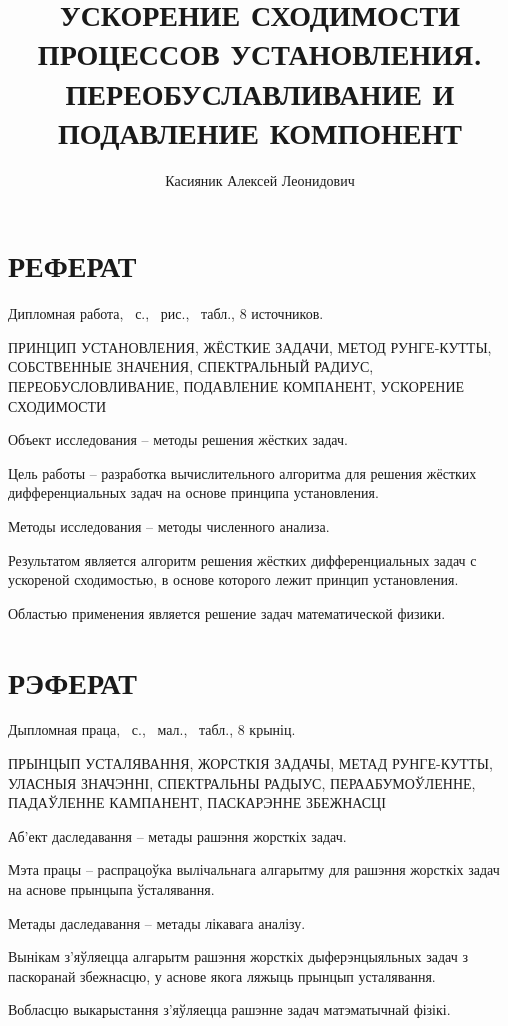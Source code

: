\documentclass[a4paper,14pt]{extreport}
\title{УСКОРЕНИЕ СХОДИМОСТИ ПРОЦЕССОВ УСТАНОВЛЕНИЯ. ПЕРЕОБУСЛАВЛИВАНИЕ И ПОДАВЛЕНИЕ КОМПОНЕНТ}
\author{Касияник Алексей Леонидович}
\begin{document}
  \maketitle
  
  \setcounter{page}{2}
\newpage
\chapter*{РЕФЕРАТ}

Дипломная работа, \pageref{LastPage}~с., \totfig~рис., \tottab~табл., 8 источников.

ПРИНЦИП УСТАНОВЛЕНИЯ, ЖЁСТКИЕ ЗАДАЧИ, МЕТОД РУНГЕ-КУТТЫ, СОБСТВЕННЫЕ ЗНАЧЕНИЯ, СПЕКТРАЛЬНЫЙ РАДИУС, ПЕРЕОБУСЛОВЛИВАНИЕ, ПОДАВЛЕНИЕ КОМПАНЕНТ, УСКОРЕНИЕ СХОДИМОСТИ

Объект исследования – методы решения жёстких задач.

Цель работы – разработка вычислительного алгоритма для решения жёстких дифференциальных задач на основе принципа установления.

Методы исследования – методы численного анализа.%

Результатом является алгоритм решения жёстких дифференциальных задач с ускореной сходимостью, в основе которого лежит принцип установления.

Областью применения является решение задач математической физики.

\chapter*{РЭФЕРАТ}

Дыпломная праца, \pageref{LastPage}~с., \totfig~мал., \tottab~табл., 8 крыніц.

ПРЫНЦЫП УСТАЛЯВАННЯ, ЖОРСТКІЯ ЗАДАЧЫ, МЕТАД РУНГЕ-КУТТЫ, УЛАСНЫЯ ЗНАЧЭННІ, СПЕКТРАЛЬНЫ РАДЫУС, ПЕРААБУМОЎЛЕННЕ, ПАДАЎЛЕННЕ КАМПАНЕНТ, ПАСКАРЭННЕ ЗБЕЖНАСЦІ

Аб'ект даследавання – метады рашэння жорсткіх задач.

Мэта працы – распрацоўка вылічальнага алгарытму для рашэння жорсткіх задач на аснове прынцыпа ўсталявання.

Метады даследавання – метады лікавага аналізу.%

Вынікам з'яўляецца алгарытм рашэння жорсткіх дыферэнцыяльных задач з паскоранай збежнасцю, у аснове якога ляжыць прынцып усталявання.

Вобласцю выкарыстання з'яўляецца рашэнне задач матэматычнай фізікі.
\end{document}
